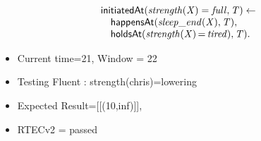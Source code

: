 \documentclass[8pt]{beamer}
\DeclareMathOperator{\val}{=}  %
\def \patsize {}
\def\happensAt{\textsf{\patsize happensAt}}
\def\holdsAt{\textsf{\patsize holdsAt}}
\def\initiatedAt{\textsf{\patsize initiatedAt}}
\newenvironment{mysplit}%
  {\arraycolsep 0pt \begin{array}{l}}%
  {\end{array}}
\begin{document}
\begin{frame}
\begin{minipage}{0.55\linewidth}
\begin{align*}
\begin{mysplit}
                \initiatedAt\mathit{(strength(X)=full,T)\leftarrow}\\
                \quad    \happensAt\mathit{(sleep\_end(X),T),}\\
                \quad    \holdsAt\mathit{(strength(X)\val tired),T).}\\
            \end{mysplit}
        \end{align*}
    \end{minipage}
    \begin{itemize}
        \item Current time=21, Window = 22
        \item Testing Fluent :  strength(chris)=lowering
        \item Expected Result=[[(10,inf)]],
        \item RTECv2 = passed

    \end{itemize}
\end{frame}
\end{document}
